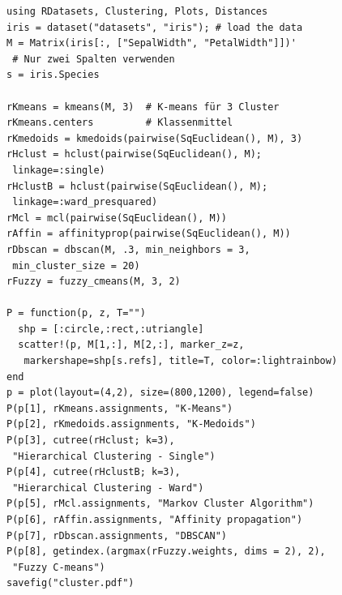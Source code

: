 \documentclass[10pt,twocolumn]{scrartcl}
\begin{document}
\begin{lstlisting}
using RDatasets, Clustering, Plots, Distances
iris = dataset("datasets", "iris"); # load the data
M = Matrix(iris[:, ["SepalWidth", "PetalWidth"]])'
 # Nur zwei Spalten verwenden
s = iris.Species

rKmeans = kmeans(M, 3)  # K-means für 3 Cluster
rKmeans.centers         # Klassenmittel
rKmedoids = kmedoids(pairwise(SqEuclidean(), M), 3)
rHclust = hclust(pairwise(SqEuclidean(), M);
 linkage=:single)
rHclustB = hclust(pairwise(SqEuclidean(), M);
 linkage=:ward_presquared)
rMcl = mcl(pairwise(SqEuclidean(), M))
rAffin = affinityprop(pairwise(SqEuclidean(), M))
rDbscan = dbscan(M, .3, min_neighbors = 3,
 min_cluster_size = 20)
rFuzzy = fuzzy_cmeans(M, 3, 2)

P = function(p, z, T="")
  shp = [:circle,:rect,:utriangle]
  scatter!(p, M[1,:], M[2,:], marker_z=z,
   markershape=shp[s.refs], title=T, color=:lightrainbow)
end 
p = plot(layout=(4,2), size=(800,1200), legend=false)
P(p[1], rKmeans.assignments, "K-Means")
P(p[2], rKmedoids.assignments, "K-Medoids")
P(p[3], cutree(rHclust; k=3),
 "Hierarchical Clustering - Single")
P(p[4], cutree(rHclustB; k=3),
 "Hierarchical Clustering - Ward")
P(p[5], rMcl.assignments, "Markov Cluster Algorithm")
P(p[6], rAffin.assignments, "Affinity propagation")
P(p[7], rDbscan.assignments, "DBSCAN")
P(p[8], getindex.(argmax(rFuzzy.weights, dims = 2), 2),
 "Fuzzy C-means")
savefig("cluster.pdf")
\end{lstlisting}
\end{document}
